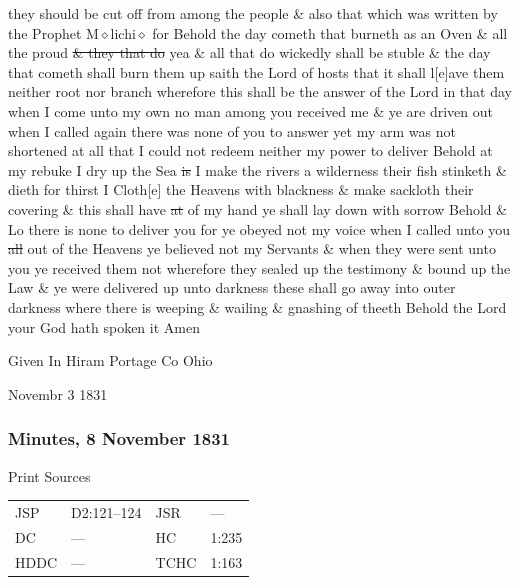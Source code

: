 {they should be cut off from among the people \& also that which was written by the Prophet M$\diamond$lichi$\diamond$ for Behold the day cometh that burneth as an Oven \& all the proud \sout{\& they that do} yea \& all that do wickedly shall be stuble \& the day that cometh shall burn them up saith the Lord of hosts that it shall l[e]ave them neither root nor branch wherefore this shall be the answer of the Lord in that day when I come unto my own no man among you received me \& ye are driven out when I called again there was none of you to answer yet my arm was not shortened at all that I could not redeem neither my power to deliver Behold at my rebuke I dry up the Sea \sout{is} I make the rivers a wilderness their fish stinketh \& dieth for thirst I Cloth[e] the Heavens with blackness \& make sackloth their covering \& this shall have \sout{at} of my hand ye shall lay down with sorrow Behold \& Lo there is none to deliver you for ye obeyed not my voice when I called unto you \sout{all} out of the Heavens ye believed not my Servants \& when they were sent unto you ye received them not wherefore they sealed up the testimony \& bound up the Law \& ye were delivered up unto darkness these shall go away into outer darkness where there is weeping \& wailing \& gnashing of theeth Behold the Lord your God hath spoken it Amen
				
				Given In Hiram Portage Co Ohio
				
				Novembr 3 1831
				
		\subsubsection{Minutes, 8 November 1831}
			\label{EMS-1831-JS-8-NOV-1831}
		
			\begin{description}
				\item[Print Sources]
			\end{description}

				\begin{tabular}{p{0.5in}p{1in}p{0.5in}p{1in}}
				JSP	 	& D2:121--124	& JSR 		& --- \\
				DC	 	& ---		 	& HC 		& 1:235 \\
				HDDC 	& ---			& TCHC 		& 1:163 \\
				\end{tabular}
			
}
